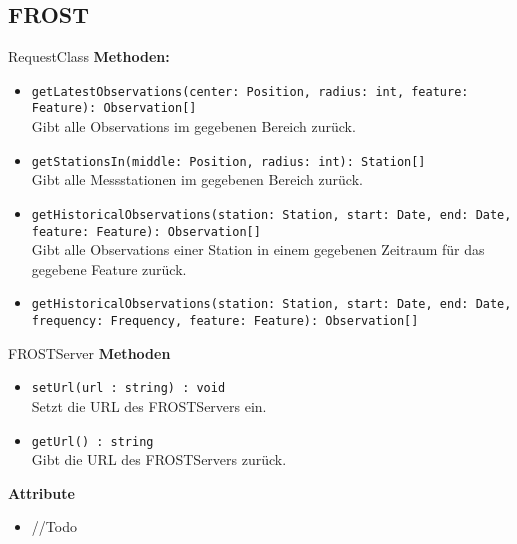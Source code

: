 \subsection{FROST}

\begin{Class}{RequestClass}
    \textbf{Methoden:}
    \begin{itemize}
        \item \texttt{getLatestObservations(center: Position, radius: int, feature: Feature): Observation[]}
        \\Gibt alle Observations im gegebenen Bereich zurück.
        \item \texttt{getStationsIn(middle: Position, radius: int): Station[]}
        \\Gibt alle Messstationen im gegebenen Bereich zurück.
        \item \texttt{getHistoricalObservations(station: Station, start: Date, end: Date, feature: Feature): Observation[]}
        \\Gibt alle Observations einer Station in einem gegebenen Zeitraum für das gegebene Feature zurück.
        \item \texttt{getHistoricalObservations(station: Station, start: Date, end: Date, frequency: Frequency, feature: Feature): Observation[]}
        
    \end{itemize}
\end{Class}

\begin{Class}{FROSTServer}
    \textbf{Methoden}
    \begin{itemize}
        \item \texttt{setUrl(url : string) : void}
        \\Setzt die URL des FROSTServers ein.
        \item \texttt{getUrl() : string}
        \\Gibt die URL des FROSTServers zurück.
    \end{itemize}
    
    \textbf{Attribute}
    \begin{itemize}
        \item //Todo
    \end{itemize}
\end{Class}

